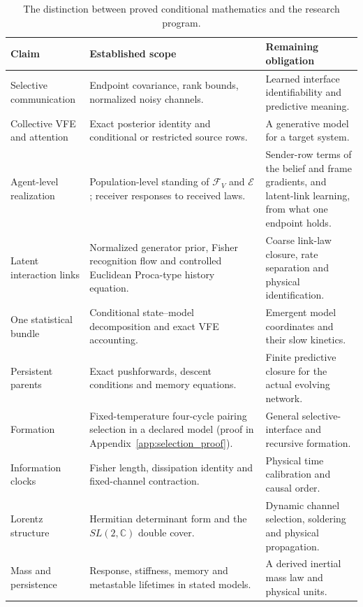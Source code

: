 \begin{table}[ht]
\centering\small
\begin{tabularx}{\textwidth}{@{}p{}XX@{}}
\toprule
Claim & Established scope & Remaining obligation\\
\midrule
Selective communication & Endpoint covariance, rank bounds, normalized noisy channels. & Learned interface identifiability and predictive meaning.\\
Collective VFE and attention & Exact posterior identity and conditional or restricted source rows. & A generative model for a target system.\\
Agent-level realization & Population-level standing of $\mathcal F_V$ and $\mathcal E$; receiver responses to received laws. & Sender-row terms of the belief and frame gradients, and latent-link learning, from what one endpoint holds.\\
Latent interaction links & Normalized generator prior, Fisher recognition flow and controlled Euclidean Proca-type history equation. & Coarse link-law closure, rate separation and physical identification.\\
One statistical bundle & Conditional state--model decomposition and exact VFE accounting. & Emergent model coordinates and their slow kinetics.\\
Persistent parents & Exact pushforwards, descent conditions and memory equations. & Finite predictive closure for the actual evolving network.\\
Formation & Fixed-temperature four-cycle pairing selection in a declared model (proof in Appendix~\ref{app:selection_proof}). & General selective-interface and recursive formation.\\
Information clocks & Fisher length, dissipation identity and fixed-channel contraction. & Physical time calibration and causal order.\\
Lorentz structure & Hermitian determinant form and the $SL(2,\mathbb C)$ double cover. & Dynamic channel selection, soldering and physical propagation.\\
Mass and persistence & Response, stiffness, memory and metastable lifetimes in stated models. & A derived inertial mass law and physical units.\\
\bottomrule
\end{tabularx}
\caption{The distinction between proved conditional mathematics and the research program.}\label{tab:claim_status}
\end{table}

